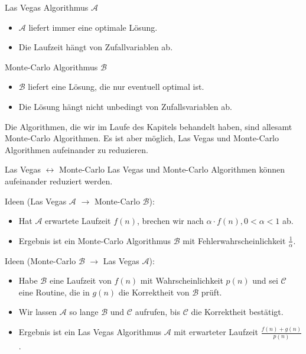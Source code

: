 \documentclass{panikzettel}
\begin{document}
\begin{halfboxl}
\vspace{-\baselineskip}
\begin{defi}{Las Vegas Algorithmus $\mathcal{A}$}
\begin{itemize}[leftmargin=*]
    \item $\mathcal{A}$ liefert immer eine optimale Lösung.
    \item Die Laufzeit hängt von Zufallvariablen ab.
\end{itemize}
\end{defi}
\end{halfboxl}%
\begin{halfboxr}
\vspace{-\baselineskip}
\begin{defi}{Monte-Carlo Algorithmus $\mathcal{B}$}
\begin{itemize}[leftmargin=*]
    \item $\mathcal{B}$ liefert eine Lösung, die nur eventuell optimal ist.
    \item Die Lösung hängt nicht unbedingt von Zufallsvariablen ab.
\end{itemize}
\end{defi}
\end{halfboxr}

Die Algorithmen, die wir im Laufe des Kapitels behandelt haben, sind allesamt Monte-Carlo Algorithmen. Es ist aber möglich, Las Vegas und Monte-Carlo Algorithmen aufeinander zu reduzieren.

\begin{theo}{Las Vegas $\leftrightarrow$ Monte-Carlo}
Las Vegas und Monte-Carlo Algorithmen können aufeinander reduziert werden.
\end{theo}

Ideen (Las Vegas $\mathcal{A}$ $\to$ Monte-Carlo $\mathcal{B}$):
\begin{itemize}
    \item Hat $\mathcal{A}$ erwartete Laufzeit $f(n)$, brechen wir nach $\alpha \cdot f(n), 0 < \alpha < 1$ ab.
    \item Ergebnis ist ein Monte-Carlo Algorithmus $\mathcal{B}$ mit Fehlerwahrscheinlichkeit $\frac{1}{\alpha}$.
\end{itemize}

Ideen (Monte-Carlo $\mathcal{B}$ $\to$ Las Vegas $\mathcal{A}$):
\begin{itemize}
    \item Habe $\mathcal{B}$ eine Laufzeit von $f(n)$ mit Wahrscheinlichkeit $p(n)$ und sei $\mathcal{C}$ eine Routine, die in $g(n)$ die Korrektheit von $\mathcal{B}$ prüft.
    \item Wir lassen $\mathcal{A}$ so lange $\mathcal{B}$ und $\mathcal{C}$ aufrufen, bis $\mathcal{C}$ die Korrektheit bestätigt.
    \item Ergebnis ist ein Las Vegas Algorithmus $\mathcal{A}$ mit erwarteter Laufzeit $\frac{f(n)+g(n)}{p(n)}$.
\end{itemize}
\end{document}
